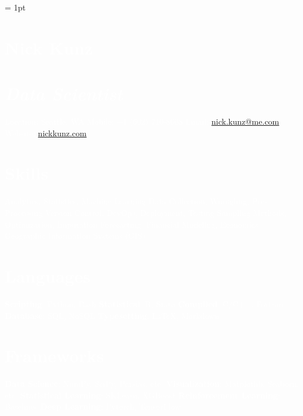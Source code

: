 \documentclass{article}
\author{Nick Kunz}
\begin{document}
\noindent
\scriptsize
{}\font = 1pt
    \begin{bgbox}[
        height = \paperheight,
        width = 0.3\textwidth,
        colback = gray
    ]
        \textcolor{white}{
            \section*{Nick Kunz}
            \section*{\textit{\normalsize{Data Scientist}}}
                Location: \space\space\space Seattle, WA\newline
                Mobile: \space\space\space\space\space\space+1 $($602$)$ 710-8608\newline
                Email: \space\space\space\space\space\space\space\space\space\url{nick.kunz@me.com}\newline
                Website: \space\space\space\space\space\url{nickkunz.com}
            \section*{Skills}
                Analytics, Statistics, Machine Learning\newline
                Data Collection, Wrangling, Pre-Processing\newline
                Version Control, DevOps, Deployment, Testing\newline
                Sampling Methods, Optimization, Imputation\newline
                Forecasting, Financial Modeling, Economics\newline
                Geographic Information Systems (GIS)
            \section*{Languages}
                \textbf{Scripting}: Python, Bash\newline
                \textbf{Statistical}: R, Stata\newline
                \textbf{Compiled}: C/C++, Fortran\newline
                \textbf{Database}: SQL, NoSQL\newline
                \textbf{Typesetting}: \LaTeX, Markdown
            \section*{Frameworks}
                \textbf{Data Science}: NumPy, SciPy, Pandas, etc.\newline
                \textbf{Visualization}: Matplotlib, Seaborn, etc.\newline
                \textbf{Statistical Learning}: SKLearn, XGBoost\newline
                \textbf{Reinforcement Learning}: Baselines\newline
                \textbf{Deep Learning}: Pytorch, TensorFlow
}
\end{bgbox}
\end{document}
